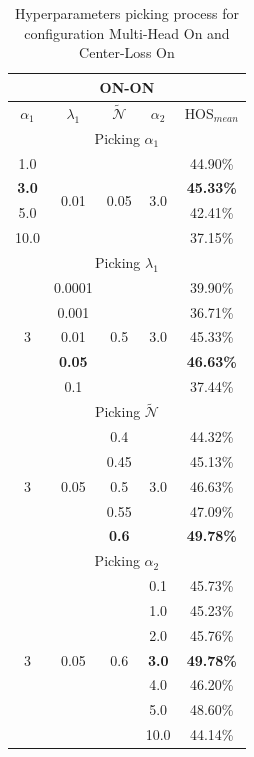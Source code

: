 \documentclass[10pt,twocolumn,letterpaper]{article}
\begin{document}
\begin{table}
  \centering
  \begin{tabular}[h]{||c|c|c|c||c||}
    \hline
    \multicolumn{5}{||c||}{ON-ON} \\
    \hline
    $\alpha_1$ & $\lambda_1$ & $\mathcal{\tilde N}$ & $\alpha_2$ & HOS$_{mean}$ \\
    \hline
    \hline
    \multicolumn{5}{||c||}{Picking $\alpha_1$} \\
    \hline
    1.0 & \multirow{4}{*}{0.01} & \multirow{4}{*}{0.05} & \multirow{4}{*}{3.0} & 44.90\% \\
    {\bf 3.0} & && & {\bf 45.33\%} \\
    5.0 & && & 42.41\% \\
    10.0 & && & 37.15\% \\
    \hline
    \hline
    \multicolumn{5}{||c||}{Picking $\lambda_1$} \\
    \hline
    \multirow{5}{*}{3} & 0.0001 & \multirow{5}{*}{0.5} & \multirow{5}{*}{3.0} & 39.90\% \\
    & 0.001 & & & 36.71\% \\
    & 0.01 & & & 45.33\% \\
    & {\bf 0.05 }& & & {\bf 46.63\%} \\
    & 0.1 & & & 37.44\% \\
    \hline
    \hline
    \multicolumn{5}{||c||}{Picking $\mathcal{\tilde N}$} \\
    \hline
    \multirow{5}{*}{3} & \multirow{5}{*}{0.05} & 0.4 & \multirow{5}{*}{3.0} & 44.32\% \\
    & & 0.45 & & 45.13\% \\
    & & 0.5 & & 46.63\% \\
    & & 0.55 & & 47.09\% \\
    & & {\bf 0.6} & & {\bf 49.78\%} \\
    \hline
    \hline
    \multicolumn{5}{||c||}{Picking $\alpha_2$} \\
    \hline
    \multirow{7}{*}{3} & \multirow{7}{*}{0.05} & \multirow{7}{*}{0.6} & 0.1 & 45.73\% \\
    & & & 1.0 & 45.23\% \\
    & & & 2.0 & 45.76\% \\
    & & & {\bf 3.0} & {\bf 49.78\%} \\
    & & & 4.0 & 46.20\% \\
    & & & 5.0 & 48.60\% \\
    & & & 10.0 & 44.14\% \\
    \hline
  \end{tabular}
  \caption{\centering\label{tab:ablationonon} Hyperparameters picking process for configuration Multi-Head On and Center-Loss On}
\end{table}
\end{document}
